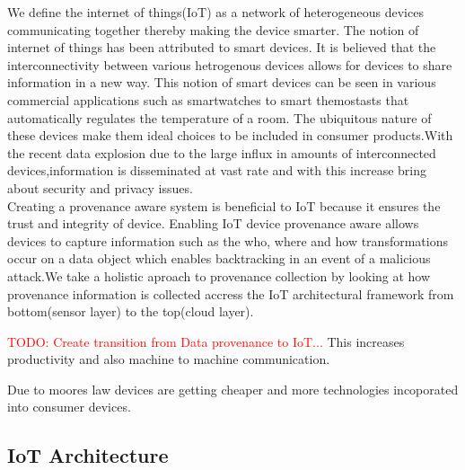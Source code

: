 We define the internet of things(IoT) as a network of heterogeneous devices communicating together thereby making the device smarter. The notion of internet of things has been attributed to smart devices. It is believed that the interconnectivity between various hetrogenous devices allows for devices to share information in a new way. This notion of smart devices can be seen in various commercial applications such as smartwatches to smart themostasts that automatically regulates the temperature of a room. The ubiquitous nature of these devices make them ideal choices to be included in consumer products.With the recent data explosion due to the large influx in amounts of interconnected devices,information is disseminated at vast rate and with this increase bring about security and privacy issues. \\

Creating a provenance aware system is beneficial to IoT because it ensures the trust and  integrity of device. Enabling IoT device provenance aware allows devices to capture information such as the who, where and how transformations occur on a data object which enables  backtracking in an event of a malicious attack.We take a holistic aproach to provenance collection by looking at how provenance information is collected accress the IoT architectural framework from bottom(sensor layer) to the top(cloud layer).

  \textcolor{red}{TODO: Create transition from Data provenance to IoT...}   This increases productivity and also machine to machine communication.
  
  
  Due to moores law devices are getting cheaper and more technologies incoporated into consumer devices.
  
  
  
  
  
 
  
  
  \subsection{IoT Architecture}

